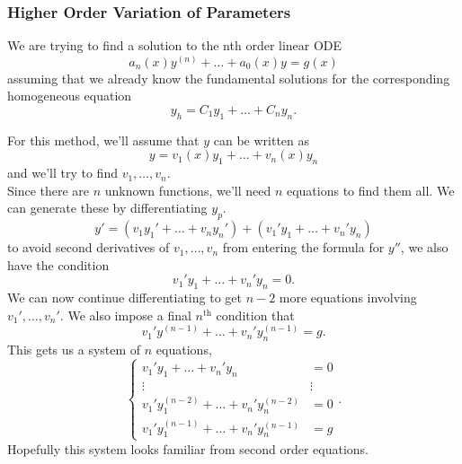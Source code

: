 \subsubsection{Higher Order Variation of Parameters}
\noindent
We are trying to find a solution to the nth order linear ODE
\begin{equation*}
	a_n(x)y^{(n)} + \ldots + a_0(x)y = g(x)
\end{equation*}
assuming that we already know the fundamental solutions for the corresponding homogeneous equation
\begin{equation*}
	y_h = C_1y_1 + \ldots + C_ny_n.
\end{equation*}

\noindent
For this method, we'll assume that $y$ can be written as
\begin{equation*}
	y = v_1(x)y_1 + \ldots + v_n(x)y_n
\end{equation*}
and we'll try to find $v_1, \ldots, v_n$.\\

\noindent
Since there are $n$ unknown functions, we'll need $n$ equations to find them all.
We can generate these by differentiating $y_p$.
\begin{equation*}
	y' = \left(v_1y_1' + \ldots + v_ny_n'\right) + \left(v_1'y_1 + \ldots + v_n'y_n\right)
\end{equation*}
to avoid second derivatives of $v_1, \ldots, v_n$ from entering the formula for $y''$, we also have the condition
\begin{equation*}
	v_1'y_1 + \ldots +v_n'y_n = 0.
\end{equation*}
We can now continue differentiating to get $n-2$ more equations involving $v_1', \ldots, v_n'$.
We also impose a final $n^{\text{th}}$ condition that
\begin{equation*}
	v_1'y^{(n-1)} + \ldots + v_n'y_n^{(n-1)} = g.
\end{equation*}
This gets us a system of $n$ equations,
\begin{equation*}
	\begin{cases}
		v_1'y_1 + \ldots + v_n' y_n & = 0 \\
		\vdots & \vdots \\
		v_1'y_1^{(n-2)} + \ldots + v_n'y_n^{(n-2)} & = 0 \\
		v_1'y_1^{(n-1)} + \ldots + v_n'y_n^{(n-1)} & = g
	\end{cases} .
\end{equation*}
Hopefully this system looks familiar from second order equations.\\

